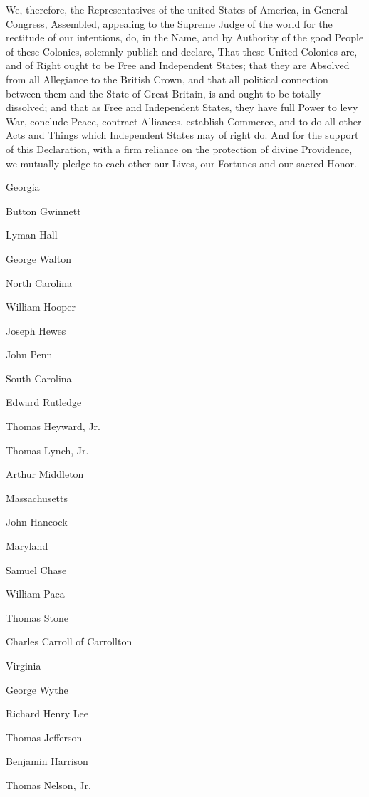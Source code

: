 \documentclass[a4paper,landscape,10pt]{article}
\begin{document}
We, therefore, the Representatives of the united States of America,
in General Congress, Assembled,
appealing to the Supreme Judge of the world for the rectitude of our intentions,
do, in the Name, and by Authority of the good People of these Colonies, solemnly publish and declare,
That these United Colonies are, and of Right ought to be Free and Independent States;
that they are Absolved from all Allegiance to the British Crown,
and that all political connection between them and the State of Great Britain,
is and ought to be totally dissolved;
and that as Free and Independent States,
they have full Power
to levy War,
conclude Peace,
contract Alliances,
establish Commerce,
and to do all other Acts and Things which Independent States may of right do.
And for the support of this Declaration,
with a firm reliance on the protection of divine Providence,
we mutually pledge to each other our Lives, our Fortunes and our sacred Honor.

Georgia

Button Gwinnett

Lyman Hall

George Walton



North Carolina

William Hooper

Joseph Hewes

John Penn



South Carolina

Edward Rutledge

Thomas Heyward, Jr.

Thomas Lynch, Jr.

Arthur Middleton



Massachusetts

John Hancock

Maryland

Samuel Chase

William Paca

Thomas Stone

Charles Carroll of Carrollton



Virginia

George Wythe

Richard Henry Lee

Thomas Jefferson

Benjamin Harrison

Thomas Nelson, Jr.
\end{document}
